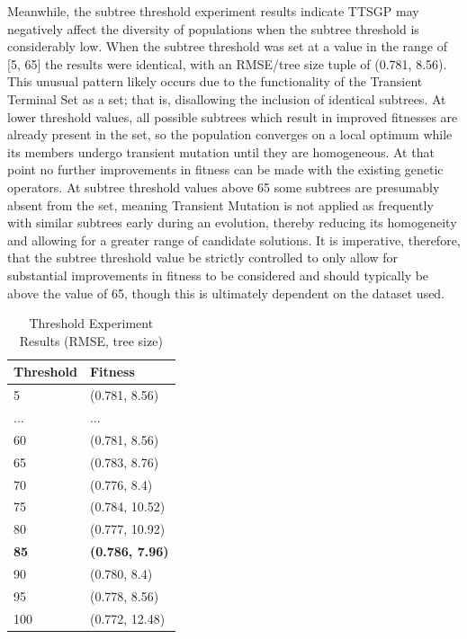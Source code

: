 \documentclass[a4paper, twocolumn]{article}
\begin{document}
Meanwhile, the subtree threshold experiment results indicate TTSGP may negatively affect the diversity of populations when the subtree threshold is considerably low. When the subtree threshold was set at a value in the range of [5, 65] the results were identical, with an RMSE/tree size tuple of (0.781, 8.56). This unusual pattern likely occurs due to the functionality of the Transient Terminal Set as a set; that is, disallowing the inclusion of identical subtrees. At lower threshold values, all possible subtrees which result in improved fitnesses are already present in the set, so the population converges on a local optimum while its members undergo transient mutation until they are homogeneous. At that point no further improvements in fitness can be made with the existing genetic operators. At subtree threshold values above 65 some subtrees are presumably absent from the set, meaning Transient Mutation is not applied as frequently with similar subtrees early during an evolution, thereby reducing its homogeneity and allowing for a greater range of candidate solutions. It is imperative, therefore, that the subtree threshold value be strictly controlled to only allow for substantial improvements in fitness to be considered and should typically be above the value of 65, though this is ultimately dependent on the dataset used.
\newline
\begin{table}[H]
	\begin{center}
		\caption{Threshold Experiment Results (RMSE, tree size)}
		\label{table:Y}
		\begin{tabularx}{\columnwidth}{X|X}
			Threshold&Fitness\\
			\hline
			5&(0.781, 8.56)\\
			...&...\\
			60&(0.781, 8.56)\\
			65&(0.783, 8.76)\\
			70&(0.776, 8.4)\\
			75&(0.784, 10.52)\\
			80&(0.777, 10.92)\\
			\textbf{85}&\textbf{(0.786, 7.96)}\\
			90&(0.780, 8.4)\\
			95&(0.778, 8.56)\\
			100&(0.772, 12.48)\\
		\end{tabularx}
	\end{center}
\end{table}
\end{document}
